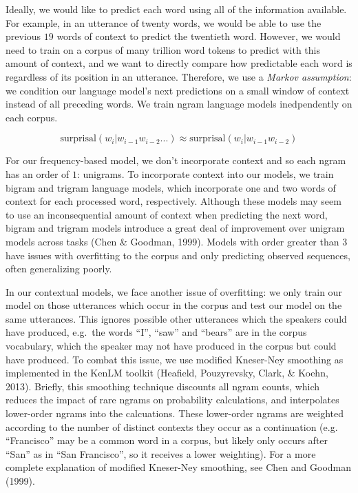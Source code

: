 \documentclass[man,floatsintext]{apa6}
\begin{document}
Ideally, we would like to predict each word using all of the information available. For example, in an utterance of twenty words, we would be able to use the previous \(19\) words of context to predict the twentieth word. However, we would need to train on a corpus of many trillion word tokens to predict with this amount of context, and we want to directly compare how predictable each word is regardless of its position in an utterance. Therefore, we use a \emph{Markov assumption}: we condition our language model's next predictions on a small window of context instead of all preceding words. We train ngram language models inedpendently on each corpus.

\[\text{surprisal}(w_i|w_{i-1}w_{i-2}...) \approx \text{surprisal}(w_i|w_{i-1}w_{i-2})\]

For our frequency-based model, we don't incorporate context and so each ngram has an order of \(1\): unigrams. To incorporate context into our models, we train bigram and trigram language models, which incorporate one and two words of context for each processed word, respectively. Although these models may seem to use an inconsequential amount of context when predicting the next word, bigram and trigram models introduce a great deal of improvement over unigram models across tasks (Chen \& Goodman, 1999). Models with order greater than \(3\) have issues with overfitting to the corpus and only predicting observed sequences, often generalizing poorly.

In our contextual models, we face another issue of overfitting: we only train our model on those utterances which occur in the corpus and test our model on the same utterances. This ignores possible other utterances which the speakers could have produced, e.g.~the words \enquote{I}, \enquote{saw} and \enquote{bears} are in the corpus vocabulary, which the speaker may not have produced in the corpus but could have produced. To combat this issue, we use modified Kneser-Ney smoothing as implemented in the KenLM toolkit (Heafield, Pouzyrevsky, Clark, \& Koehn, 2013). Briefly, this smoothing technique discounts all ngram counts, which reduces the impact of rare ngrams on probability calculations, and interpolates lower-order ngrams into the calcuations. These lower-order ngrams are weighted according to the number of distinct contexts they occur as a continuation (e.g. \enquote{Francisco} may be a common word in a corpus, but likely only occurs after \enquote{San} as in \enquote{San Francisco}, so it receives a lower weighting). For a more complete explanation of modified Kneser-Ney smoothing, see Chen and Goodman (1999).
\end{document}
